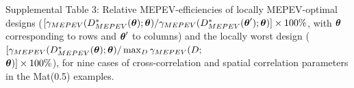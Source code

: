 \documentclass[12pt]{article}
\def\btheta{\mbox{\boldmath$\theta$}}
\begin{document}
\newpage
\noindent
Supplemental Table 3:  Relative MEPEV-efficiencies of locally MEPEV-optimal designs ($[\gamma_{MEPEV}(D^{*}_{MEPEV}(\btheta);\btheta)/\gamma_{MEPEV}(D^{*}_{MEPEV}(\btheta^{\prime});\btheta)]\times 100\%$, with $\btheta$ corresponding to rows and $\btheta^{\prime}$ to columns) and the locally worst design ($[\gamma_{MEPEV}(D^{*}_{MEPEV}(\btheta);\btheta)/\max_{D}\gamma_{MEPEV}(D;$\\$\btheta)]\times 100\%$), for nine cases of cross-correlation and spatial correlation parameters in the Mat(0.5) examples.
\end{document}
